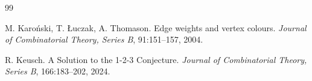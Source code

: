 \documentclass[a4paper,11pt,dvipsnames]{elsarticle}
\begin{document}
\begin{thebibliography}{99}



 M. Karo\'nski, T. {\L}uczak, A. Thomason. Edge weights and vertex colours. \textit{Journal of Combinatorial Theory, Series B}, 91:151--157, 2004.

 R. Keusch. A Solution to the 1-2-3 Conjecture. \textit{Journal of Combinatorial Theory, Series B}, 166:183--202, 2024.












\end{thebibliography}
\end{document}
